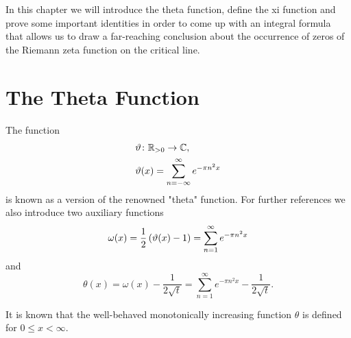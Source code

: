 In this chapter we will introduce the theta function, define the xi function and prove some important identities in order to come up with an integral formula that allows us to draw a far-reaching conclusion about the occurrence of zeros of the Riemann zeta function on the critical line.


\section{The Theta Function}


\begin{definition}
	The function
\begin{equation*}
\begin{aligned}
	&\vartheta \colon \mathbb{R}_{> 0} \to \mathbb{C}, \\
	&\vartheta(x) = \sum _{n = -\infty} ^{\infty} e^{-\pi n^2 x}
\end{aligned}
\end{equation*}
	is known as a version of the renowned "theta" function. For further references we also introduce two auxiliary functions
\begin{equation*}
	\omega(x) = \frac{1}{2}\left(\vartheta(x) - 1\right) = \sum _{n = 1} ^{\infty} e^{-\pi n^2 x}
\end{equation*}
	and
\begin{equation*}
	\theta(x) = \omega(x) - \frac{1}{2 \sqrt{t}} = \sum _{n = 1} ^{\infty} e^{-\pi n^2 x} - \frac{1}{2 \sqrt{t}}.
\end{equation*}
\end{definition}


\begin{remark}
	It is known that the well-behaved monotonically increasing function $\theta$ is defined for $0 \leq x < \infty$.
\end{remark}


